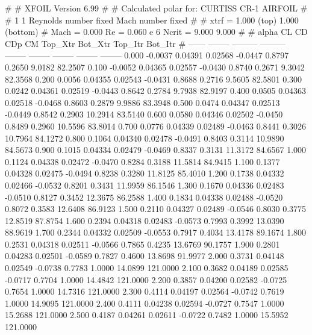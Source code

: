 #  
#       XFOIL         Version 6.99
#  
# Calculated polar for: CURTISS CR-1 AIRFOIL                            
#  
# 1 1 Reynolds number fixed          Mach number fixed         
#  
# xtrf =   1.000 (top)        1.000 (bottom)  
# Mach =   0.000     Re =     0.060 e 6     Ncrit =   9.000  9.000
#  
#   alpha    CL        CD       CDp       CM     Top_Xtr  Bot_Xtr  Top_Itr  Bot_Itr
#  ------ -------- --------- --------- -------- -------- -------- -------- --------
   0.000  -0.0037   0.04391   0.02568  -0.0447   0.8797   0.2650   9.0182  82.2507
   0.100  -0.0052   0.04365   0.02557  -0.0430   0.8740   0.2671   9.3042  82.3568
   0.200   0.0056   0.04355   0.02543  -0.0431   0.8688   0.2716   9.5605  82.5801
   0.300   0.0242   0.04361   0.02519  -0.0443   0.8642   0.2784   9.7938  82.9197
   0.400   0.0505   0.04363   0.02518  -0.0468   0.8603   0.2879   9.9886  83.3948
   0.500   0.0474   0.04347   0.02513  -0.0449   0.8542   0.2903  10.2914  83.5140
   0.600   0.0580   0.04346   0.02502  -0.0450   0.8489   0.2960  10.5596  83.8014
   0.700   0.0776   0.04339   0.02489  -0.0463   0.8441   0.3026  10.7964  84.1272
   0.800   0.1064   0.04340   0.02478  -0.0491   0.8403   0.3114  10.9890  84.5673
   0.900   0.1015   0.04334   0.02479  -0.0469   0.8337   0.3131  11.3172  84.6567
   1.000   0.1124   0.04338   0.02472  -0.0470   0.8284   0.3188  11.5814  84.9415
   1.100   0.1377   0.04328   0.02475  -0.0494   0.8238   0.3280  11.8125  85.4010
   1.200   0.1738   0.04332   0.02466  -0.0532   0.8201   0.3431  11.9959  86.1546
   1.300   0.1670   0.04336   0.02483  -0.0510   0.8127   0.3452  12.3675  86.2588
   1.400   0.1834   0.04338   0.02488  -0.0520   0.8072   0.3583  12.6408  86.9123
   1.500   0.2110   0.04327   0.02489  -0.0546   0.8030   0.3775  12.8519  87.8754
   1.600   0.2394   0.04318   0.02483  -0.0573   0.7993   0.3992  13.0390  88.9619
   1.700   0.2344   0.04332   0.02509  -0.0553   0.7917   0.4034  13.4178  89.1674
   1.800   0.2531   0.04318   0.02511  -0.0566   0.7865   0.4235  13.6769  90.1757
   1.900   0.2801   0.04283   0.02501  -0.0589   0.7827   0.4600  13.8698  91.9977
   2.000   0.3731   0.04148   0.02549  -0.0738   0.7783   1.0000  14.0899 121.0000
   2.100   0.3682   0.04189   0.02585  -0.0717   0.7704   1.0000  14.4842 121.0000
   2.200   0.3857   0.04200   0.02582  -0.0725   0.7654   1.0000  14.7316 121.0000
   2.300   0.4114   0.04197   0.02564  -0.0742   0.7619   1.0000  14.9095 121.0000
   2.400   0.4111   0.04238   0.02594  -0.0727   0.7547   1.0000  15.2688 121.0000
   2.500   0.4187   0.04261   0.02611  -0.0722   0.7482   1.0000  15.5952 121.0000
